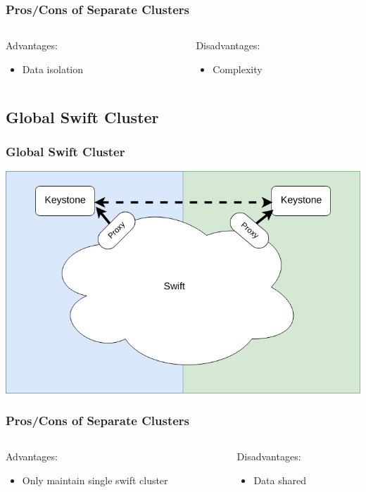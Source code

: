\documentclass[aspectratio=169,11pt,hyperref={colorlinks=true}]{beamer}
\begin{document}
\begin{frame}
\frametitle{Pros/Cons of Separate Clusters}
\begin{columns}[T]
    \begin{column}{.48\textwidth}
        Advantages:
        \begin{itemize}
            \item Data isolation
        \end{itemize}
    \end{column}
    \begin{column}{.48\textwidth}
        Disadvantages:
        \begin{itemize}
            \item Complexity
        \end{itemize}
    \end{column}
\end{columns}
\end{frame}

\subsection{Global Swift Cluster}
\begin{frame}
\frametitle{Global Swift Cluster}
\centering
\includegraphics[width=.775\textwidth]{swift-federation-global.png}
\end{frame}

\begin{frame}
\frametitle{Pros/Cons of Separate Clusters}
\begin{columns}[T]
    \begin{column}{.48\textwidth}
        Advantages:
        \begin{itemize}
            \item Only maintain single swift cluster
        \end{itemize}
    \end{column}
    \begin{column}{.48\textwidth}
        Disadvantages:
        \begin{itemize}
            \item Data shared
        \end{itemize}
    \end{column}
\end{columns}
\end{frame}
\end{document}
